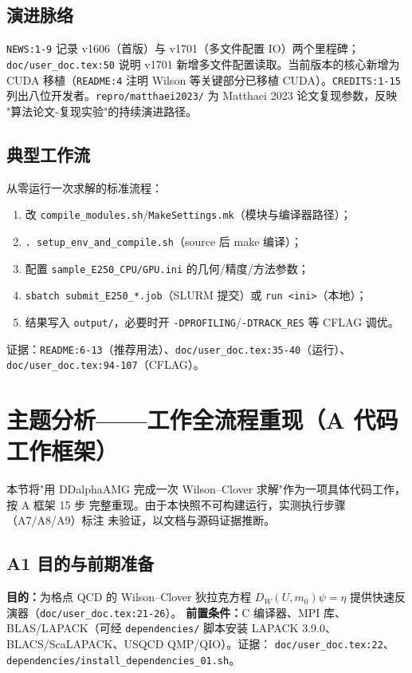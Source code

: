 \documentclass[UTF8]{ctexart}
\begin{document}
\subsection{演进脉络}
\texttt{NEWS:1-9} 记录 v1606（首版）与 v1701（多文件配置 IO）两个里程碑；
\texttt{doc/user\_doc.tex:50} 说明 v1701 新增多文件配置读取。当前版本的核心新增为
CUDA 移植（\texttt{README:4} 注明 Wilson 等关键部分已移植 CUDA）。\texttt{CREDITS:1-15}
列出八位开发者。\texttt{repro/matthaei2023/} 为 Matthaei 2023 论文复现参数，反映
"算法论文-复现实验"的持续演进路径。

\subsection{典型工作流}
从零运行一次求解的标准流程：
\begin{enumerate}
  \item 改 \texttt{compile\_modules.sh}/\texttt{MakeSettings.mk}（模块与编译器路径）；
  \item \texttt{. setup\_env\_and\_compile.sh}（source 后 make 编译）；
  \item 配置 \texttt{sample\_E250\_CPU/GPU.ini} 的几何/精度/方法参数；
  \item \texttt{sbatch submit\_E250\_*.job}（SLURM 提交）或 \texttt{run <ini>}（本地）；
  \item 结果写入 \texttt{output/}，必要时开 \texttt{-DPROFILING}/\texttt{-DTRACK\_RES} 等 CFLAG 调优。
\end{enumerate}
证据：\texttt{README:6-13}（推荐用法）、\texttt{doc/user\_doc.tex:35-40}（运行）、
\texttt{doc/user\_doc.tex:94-107}（CFLAG）。

\section{主题分析——工作全流程重现（A 代码工作框架）}

本节将"用 DDalphaAMG 完成一次 Wilson--Clover 求解"作为一项具体代码工作，按 A 框架 15 步
完整重现。由于本快照不可构建运行，\textcolor{warn}{实测执行步骤}（A7/A8/A9）标注
未验证，以文档与源码证据推断。

\subsection{A1 目的与前期准备}
\textbf{目的：}为格点 QCD 的 Wilson--Clover 狄拉克方程
$D_W(U,m_0)\psi=\eta$ 提供快速反演器（\texttt{doc/user\_doc.tex:21-26}）。
\textbf{前置条件：}C 编译器、MPI 库、BLAS/LAPACK（可经 \texttt{dependencies/}
脚本安装 LAPACK 3.9.0、BLACS/ScaLAPACK、USQCD QMP/QIO）。证据：
\texttt{doc/user\_doc.tex:22}、\texttt{dependencies/install\_dependencies\_01.sh}。
\end{document}
